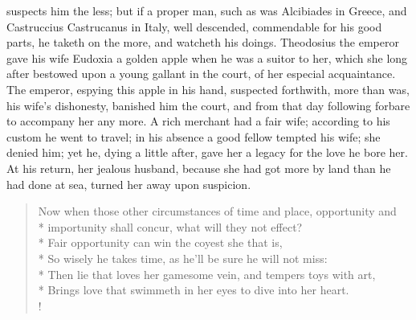 suspects him the less; but if a proper man, such as was Alcibiades in
Greece, and Castruccius Castrucanus in Italy, well descended,
commendable for his good parts, he taketh on the more, and watcheth his
doings. Theodosius the emperor gave his wife Eudoxia a golden
apple when he was a suitor to her, which she long after bestowed upon a
young gallant in the court, of her especial acquaintance. The emperor,
espying this apple in his hand, suspected forthwith, more than was, his
wife's dishonesty, banished him the court, and from that day following
forbare to accompany her any more. A rich merchant had a fair
wife; according to his custom he went to travel; in his absence a good
fellow tempted his wife; she denied him; yet he, dying a little after,
gave her a legacy for the love he bore her. At his return, her jealous
husband, because she had got more by land than he had done at sea,
turned her away upon suspicion.

\begin{verse}%
Now when those other circumstances of time and place, opportunity and\\*
importunity shall concur, what will they not effect?\\*
Fair opportunity can win the coyest she that is,\\*
So wisely he takes time, as he'll be sure he will not miss:\\*
Then lie that loves her gamesome vein, and tempers toys with art,\\*
Brings love that swimmeth in her eyes to dive into her heart.\\!
\end{verse}%

